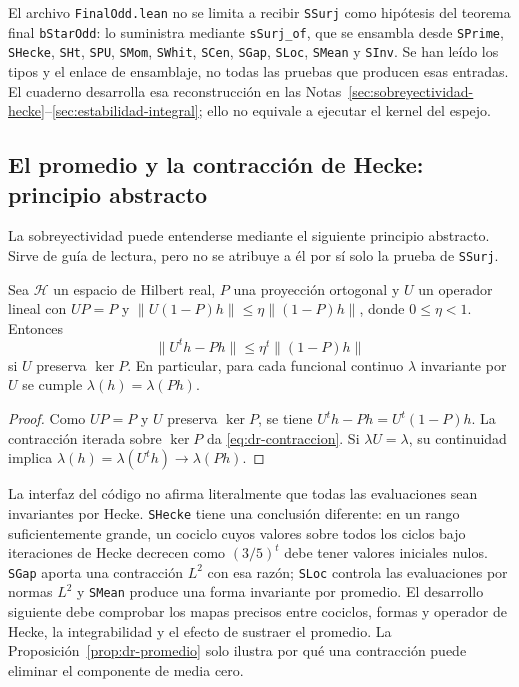 El archivo \texttt{FinalOdd.lean} no se limita a recibir \texttt{SSurj} como hipótesis del teorema final \texttt{bStarOdd}: lo suministra mediante \texttt{sSurj\_of}, que se ensambla desde \texttt{SPrime}, \texttt{SHecke}, \texttt{SHt}, \texttt{SPU}, \texttt{SMom}, \texttt{SWhit}, \texttt{SCen}, \texttt{SGap}, \texttt{SLoc}, \texttt{SMean} y \texttt{SInv}. Se han leído los tipos y el enlace de ensamblaje, no todas las pruebas que producen esas entradas. El cuaderno desarrolla esa reconstrucción en las Notas~\ref{sec:sobreyectividad-hecke}--\ref{sec:estabilidad-integral}; ello no equivale a ejecutar el kernel del espejo.

\clearpage
\subsection{El promedio y la contracción de Hecke: principio abstracto}

La sobreyectividad puede entenderse mediante el siguiente principio abstracto. Sirve de guía de lectura, pero no se atribuye a él por sí solo la prueba de \texttt{SSurj}.

\begin{proposicion}
\label{prop:dr-promedio}
Sea $\mathcal H$ un espacio de Hilbert real, $P$ una proyección ortogonal y $U$ un operador lineal con $UP=P$ y $\|U(1-P)h\|\le\eta\|(1-P)h\|$, donde $0\le\eta<1$. Entonces
\begin{equation}
 \|U^t h-Ph\|\le\eta^t\|(1-P)h\|
 \label{eq:dr-contraccion}
\end{equation}
si $U$ preserva $\ker P$. En particular, para cada funcional continuo $\lambda$ invariante por $U$ se cumple $\lambda(h)=\lambda(Ph)$.
\end{proposicion}
\begin{proof}
Como $UP=P$ y $U$ preserva $\ker P$, se tiene $U^t h-Ph=U^t(1-P)h$. La contracción iterada sobre $\ker P$ da \eqref{eq:dr-contraccion}. Si $\lambda U=\lambda$, su continuidad implica $\lambda(h)=\lambda(U^t h)\to\lambda(Ph)$.
\end{proof}

La interfaz del código no afirma literalmente que todas las evaluaciones sean invariantes por Hecke. \texttt{SHecke} tiene una conclusión diferente: en un rango suficientemente grande, un cociclo cuyos valores sobre todos los ciclos bajo iteraciones de Hecke decrecen como $(3/5)^t$ debe tener valores iniciales nulos. \texttt{SGap} aporta una contracción $L^2$ con esa razón; \texttt{SLoc} controla las evaluaciones por normas $L^2$ y \texttt{SMean} produce una forma invariante por promedio. El desarrollo siguiente debe comprobar los mapas precisos entre cociclos, formas y operador de Hecke, la integrabilidad y el efecto de sustraer el promedio. La Proposición~\ref{prop:dr-promedio} solo ilustra por qué una contracción puede eliminar el componente de media cero.

